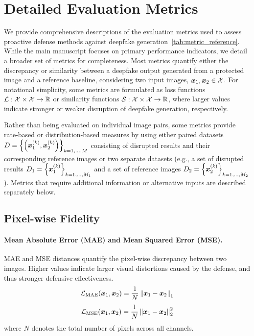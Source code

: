 \documentclass{article}
\begin{document}



\newpage
\appendix
\onecolumn

\section{Detailed Evaluation Metrics}
\label{appendix:metrics}
We provide comprehensive descriptions of the evaluation metrics used to assess proactive defense methods against deepfake generation~\ref{tab:metric_reference}. While the main manuscript focuses on primary performance indicators, we detail a broader set of metrics for completeness. Most metrics quantify either the discrepancy or similarity between a deepfake output generated from a protected image and a reference baseline, considering two input images, ${\bm{x}}_1, {\bm{x}}_2 \in \mathcal{X}$. For notational simplicity, some metrics are formulated as loss functions ${\mathcal{L}}: {\mathcal{X}} \times {\mathcal{X}} \rightarrow \mathbb{R}$ or similarity functions ${\mathcal{S}}: {\mathcal{X}} \times {\mathcal{X}} \rightarrow \mathbb{R}$, where larger values indicate stronger or weaker disruption of deepfake generation, respectively.

Rather than being evaluated on individual image pairs, some metrics provide rate-based or distribution-based measures by using either paired datasets $D = \left\{\left({\bm{x}}_1^{(k)}, {\bm{x}}_2^{(k)}\right)\right\}_{k=1,\ldots,M}$ consisting of disrupted results and their corresponding reference images or two separate datasets (e.g., a set of disrupted results $D_1=\left\{{\bm{x}}_1^{(k)}\right\}_{k=1,\ldots,M_1}$ and a set of reference images $D_2=\left\{{\bm{x}}_2^{(k)}\right\}_{k=1,\ldots,M_2}$). Metrics that require additional information or alternative inputs are described separately below.

\subsection{Pixel-wise Fidelity}
\paragraph{Mean Absolute Error (MAE) and Mean Squared Error (MSE).} MAE and MSE distances quantify the pixel-wise discrepancy between two images. Higher values indicate larger visual distortions caused by the defense, and thus stronger defensive effectiveness.
\begin{equation}
\mathcal{L}_{\mathrm{MAE}}({\bm{x}}_1,{\bm{x}}_2) = \frac{1}{N} \left\| {\bm{x}}_1 - {\bm{x}}_2 \right\|_1
\label{eq:mae_distance}
\end{equation}
\begin{equation}
\mathcal{L}_{\mathrm{MSE}}({\bm{x}}_1,{\bm{x}}_2) = \frac{1}{N} \left\| {\bm{x}}_1 - {\bm{x}}_2 \right\|_2^2
\label{eq:mse_distance}
\end{equation}
\noindent where $N$ denotes the total number of pixels across all channels.
\end{document}

